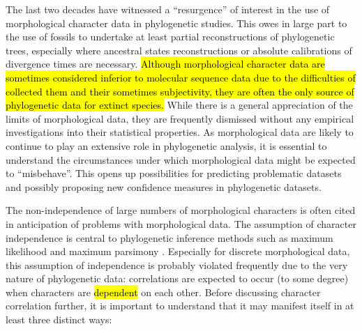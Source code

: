 \documentclass[12pt,letterpaper]{article}
\begin{document}
The last two decades have witnessed a ``resurgence'' of interest in the use of morphological character data in phylogenetic studies.
This owes in large part to the use of fossils to undertake at least partial reconstructions of phylogenetic trees, especially where ancestral states reconstructions or absolute calibrations of divergence times are necessary. 
\hl{Although morphological character data are sometimes considered inferior to molecular sequence data due to the difficulties of collected them and their sometimes subjectivity, they are often the only source of phylogenetic data for extinct species.}
While there is a general appreciation of the limits of morphological data, they are frequently dismissed without any empirical investigations into their statistical properties.
As morphological data are likely to continue to play an extensive role in phylogenetic analysis, it is essential to understand the circumstances under which morphological data might be expected to ``misbehave''.
This opens up possibilities for predicting problematic datasets and possibly proposing new confidence measures in phylogenetic datasets.

The non-independence of large numbers of morphological characters is often cited in anticipation of problems with morphological data.
The assumption of character independence is central to phylogenetic inference methods such as maximum likelihood and maximum parsimony \citep[e.g.][]{joysey1982problems,felsenstein1985phylogenies,lewisa2001,felsenstein2004inferring}.
Especially for discrete morphological data, this assumption of independence is probably violated frequently due to the very nature of phylogenetic data: correlations are expected to occur (to some degree) when characters are \hl{dependent} on each other.
Before discussing character correlation further, it is important to understand that it may manifest itself in at least three distinct ways:
\end{document}

